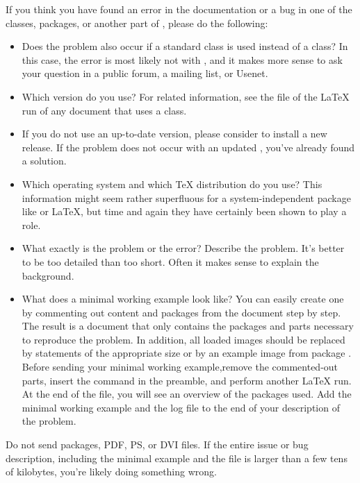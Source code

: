 If you think you have found an error in the documentation or a bug in one of
the {\KOMAScript} classes, packages, or another part of {\KOMAScript}, please
do the following:
\begin{itemize}
\item Does the problem also occur if a standard class is used instead of a
  {\KOMAScript} class? In this case, the error is most likely not with
  {\KOMAScript}, and it makes more sense to ask your question in a public
  forum, a mailing list, or Usenet.
\item Which {\KOMAScript} version do you use? For related information, see the
   file of the \LaTeX{} run of any document that uses a
  {\KOMAScript} class.
\item If you do not use an up-to-date \KOMAScript{} version, please consider
  to install a new \KOMAScript{} release. If the problem does not occur with
  an updated \KOMAScript, you've already found a solution.
\item Which operating system and which \TeX{} distribution do you use? This
  information might seem rather superfluous for a system-independent package
  like {\KOMAScript} or {\LaTeX}, but time and again they have certainly been
  shown to play a role.
\item What exactly is the problem or the error? Describe the problem. It's
  better to be too detailed than too short. Often it makes sense to explain
  the background.
\item What does a minimal working example look like? You can easily create one
  by commenting out content and packages from the document step by step.  The
  result is a document that only contains the packages and parts necessary to
  reproduce the problem. In addition, all loaded images should be replaced by
   statements of the appropriate size or by an example image from
  package  \cite{package:mwe}. Before sending your minimal
  working example,remove the commented-out parts, insert the command
   in the preamble, and perform another {\LaTeX} run. At the
  end of the  file, you will see an overview of the packages
  used. Add the minimal working example and the log file to the end of your
  description of the problem.
\end{itemize}

Do not send packages, PDF, PS, or DVI files. If the entire issue or bug
description, including the minimal example and the  file is larger
than a few tens of kilobytes, you're likely doing something wrong.


